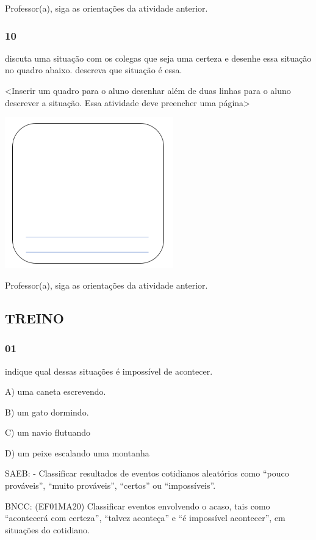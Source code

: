 Professor(a), siga as orientações da atividade anterior.

\subsubsection{10}\label{section-72}

discuta uma situação com os colegas que seja uma certeza e desenhe essa
situação no quadro abaixo. descreva que situação é essa.

\textless{}Inserir um quadro para o aluno desenhar além de duas linhas
para o aluno descrever a situação. Essa atividade deve preencher uma
página\textgreater{}

\includegraphics[width=2.86272in,height=2.57423in]{media/image92.png}

Professor(a), siga as orientações da atividade anterior.

\subsection{TREINO}\label{treino-5}

\subsubsection{01}\label{section-73}

indique qual dessas situações é impossível de acontecer.

A) uma caneta escrevendo.

B) um gato dormindo.

C) um navio flutuando

D) um peixe escalando uma montanha

SAEB: - Classificar resultados de eventos cotidianos aleatórios como
``pouco prováveis'', ``muito prováveis'', ``certos'' ou ``impossíveis''.

BNCC: (EF01MA20) Classificar eventos envolvendo o acaso, tais como
``acontecerá com certeza'', ``talvez aconteça'' e ``é impossível
acontecer'', em situações do cotidiano.

